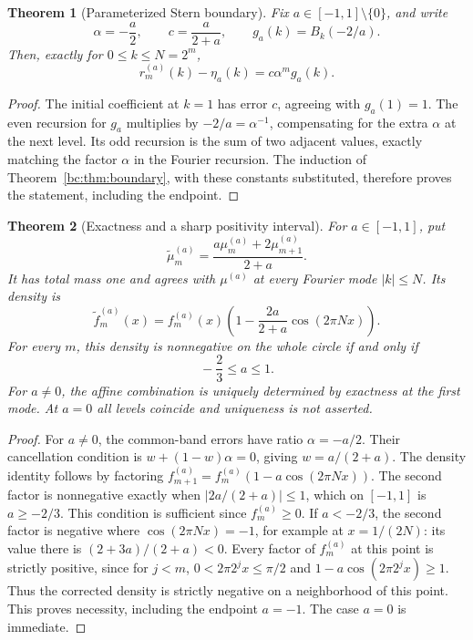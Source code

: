 \documentclass[11pt,a4paper,oneside,openany]{book}
\numberwithin{equation}{chapter}
\newtheorem{theorem}{Theorem}[chapter]
\theoremstyle{definition}
\theoremstyle{remark}
\newcommand{\mt}{\widetilde\mu}
\newcommand{\ft}{\widetilde f}
\begin{document}
\begin{theorem}[Parameterized Stern boundary]
\label{bc:thm:parameter-boundary}
Fix $a\in[-1,1]\setminus\{0\}$, and write
\begin{equation}
 \alpha=-\frac a2,\qquad c=\frac a{2+a},\qquad
 g_a(k)=B_k(-2/a).
 \label{bc:eq:parameter-g}
\end{equation}
Then, exactly for $0\le k\le N=2^m$,
\begin{equation}
 r_m^{(a)}(k)-\eta_a(k)=c\alpha^m g_a(k).
 \label{bc:eq:parameter-boundary}
\end{equation}
\end{theorem}
\begin{proof}
The initial coefficient at $k=1$ has error $c$, agreeing with $g_a(1)=1$.
The even recursion for $g_a$ multiplies by $-2/a=\alpha^{-1}$, compensating for
the extra $\alpha$ at the next level. Its odd recursion is the sum of two
adjacent values, exactly matching the factor $\alpha$ in the Fourier recursion.
The induction of Theorem~\ref{bc:thm:boundary}, with these constants substituted,
therefore proves the statement, including the endpoint.
\end{proof}

\begin{theorem}[Exactness and a sharp positivity interval]
\label{bc:thm:parameter-positive}
For $a\in[-1,1]$, put
\begin{equation}
 \mt_m^{(a)}=\frac{a\mu_m^{(a)}+2\mu_{m+1}^{(a)}}{2+a}.
 \label{bc:eq:parameter-correction}
\end{equation}
It has total mass one and agrees with $\mu^{(a)}$ at every Fourier mode
$|k|\le N$. Its density is
\begin{equation}
 \ft_m^{(a)}(x)=f_m^{(a)}(x)
     \left(1-\frac{2a}{2+a}\cos(2\pi Nx)\right).
 \label{bc:eq:parameter-density}
\end{equation}
For every $m$, this density is nonnegative on the whole circle if and only if
\begin{equation}
 \boxed{\qquad -\frac23\le a\le1.\qquad}
 \label{bc:eq:positivity-threshold}
\end{equation}
For $a\ne0$, the affine combination is uniquely determined by exactness at the
first mode. At $a=0$ all levels coincide and uniqueness is not asserted.
\end{theorem}
\begin{proof}
For $a\ne0$, the common-band errors have ratio $\alpha=-a/2$. Their cancellation
condition is $w+(1-w)\alpha=0$, giving $w=a/(2+a)$. The density identity follows
by factoring $f_{m+1}^{(a)}=f_m^{(a)}(1-a\cos(2\pi Nx))$. The second factor is
nonnegative exactly when $|2a/(2+a)|\le1$, which on $[-1,1]$ is $a\ge-2/3$.
This condition is sufficient since $f_m^{(a)}\ge0$. If $a<-2/3$, the second
factor is negative where $\cos(2\pi Nx)=-1$, for example at $x=1/(2N)$:
its value there is $(2+3a)/(2+a)<0$. Every factor of $f_m^{(a)}$ at this point
is strictly positive, since for $j<m$,
$0<2\pi2^jx\le\pi/2$ and $1-a\cos(2\pi2^jx)\ge1$.
Thus the corrected density is strictly negative on a neighborhood of this point.
This proves necessity,
including the endpoint $a=-1$. The case $a=0$ is immediate.
\end{proof}
\end{document}
